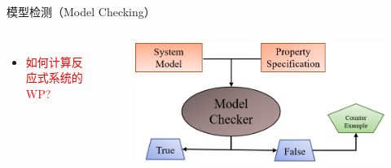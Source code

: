 \documentclass[9pt, CJK]{beamer}
\begin{document}
\begin{frame}
\begin{block}{模型检测（Model Checking）}
\begin{columns}
\begin{itemize}
				\item \textcolor{red}{如何计算反应式系统的WP?}
			\end{itemize}
			\begin{figure}
				\includegraphics[scale=0.35]{figures/MC}
			\end{figure}
		\end{columns}
	\end{block}
	\end{frame}
	
\end{document}

